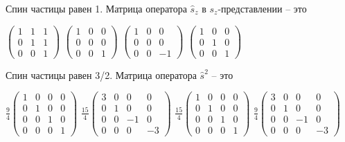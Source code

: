 \documentclass[11pt,a4paper]{exam}
\begin{document}
\begin{questions}
\question Спин частицы равен 1. Матрица оператора ${\hat s_z}$ в ${s_z}$-представлении – это
\begin{choices}
\choice $\left( {\begin{array}{*{20}{c}}
1&1&1\\
0&1&1\\
0&0&1
\end{array}} \right)$      
\choice $\left( {\begin{array}{*{20}{c}}
1&0&0\\
0&0&0\\
0&0&1
\end{array}} \right)$      
\choice $\left( {\begin{array}{*{20}{c}}
1&0&0\\
0&0&0\\
0&0&{ - 1}
\end{array}} \right)$   
\choice $\left( {\begin{array}{*{20}{c}}
1&0&0\\
0&1&0\\
0&0&1
\end{array}} \right)$
\end{choices}

\question Спин частицы равен 3/2. Матрица оператора ${\hat s^2}$ – это
\begin{choices}
\choice $\frac{9}{4}\left( {\begin{array}{*{20}{c}}
1&0&0&0\\
0&1&0&0\\
0&0&1&0\\
0&0&0&1
\end{array}} \right)$   
\choice $\frac{{15}}{4}\left( {\begin{array}{*{20}{c}}
3&0&0&0\\
0&1&0&0\\
0&0&{ - 1}&0\\
0&0&0&{ - 3}
\end{array}} \right)$   
\choice $\frac{{15}}{4}\left( {\begin{array}{*{20}{c}}
1&0&0&0\\
0&1&0&0\\
0&0&1&0\\
0&0&0&1
\end{array}} \right)$   
\choice $\frac{9}{4}\left( {\begin{array}{*{20}{c}}
3&0&0&0\\
0&1&0&0\\
0&0&{ - 1}&0\\
0&0&0&{ - 3}
\end{array}} \right)$
\end{choices}


\end{questions}
\end{document}
